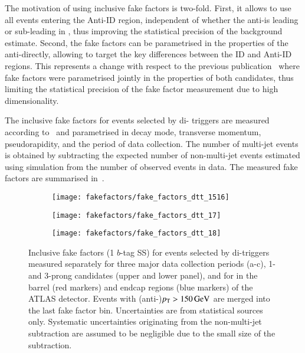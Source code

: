 {  The motivation of using inclusive fake factors is two-fold. First,
  it allows to use all events entering the Anti-ID region, independent
  of whether the anti-\tauhadvis is leading or sub-leading in \pT,
  thus improving the statistical precision of the background
  estimate. Second, the fake factors can be parametrised in the
  properties of the anti-\tauhadvis directly, allowing to target the
  key differences between the ID and Anti-ID regions. This represents
  a change with respect to the previous
  publication~\cite{HIGG-2016-16-witherratum} where fake factors were
  parametrised jointly in the properties of both \tauhadvis
  candidates, thus limiting the statistical precision of the fake
  factor measurement due to high dimensionality.

}

The inclusive fake factors for events selected by di-\tauhadvis
triggers are measured according to~ and
parametrised in \tauhadvis decay mode, transverse momentum,
pseudorapidity, and the period of data collection. The number of
multi-jet events is obtained by subtracting the expected number of
non-multi-jet events estimated using simulation from the number of
observed events in data. The measured fake factors are summarised
in~.

\begin{figure}[htbp]
  \centering

  \begin{subfigure}{0.495\textwidth}
    \texttt{[image: fakefactors/fake\_factors\_dtt\_1516]}
  \end{subfigure}
  \begin{subfigure}{0.495\textwidth}
    \texttt{[image: fakefactors/fake\_factors\_dtt\_17]}
  \end{subfigure}

  \begin{subfigure}{0.495\textwidth}
    \texttt{[image: fakefactors/fake\_factors\_dtt\_18]}
  \end{subfigure}

  \caption{Inclusive fake factors (1 $b$-tag SS) for events selected
    by di-\tauhadvis triggers measured separately for three major data
    collection periods (a-c), 1- and 3-prong \tauhadvis candidates
    (upper and lower panel), and for \tauhadvis in the barrel (red
    markers) and endcap regions (blue markers) of the ATLAS
    detector. Events with (anti-)\tauhadvis $p_{\text{T}} > \SI{150}{\ensuremath{\text{GeV}}}$ are
    merged into the last fake factor bin. Uncertainties are from
    statistical sources only. Systematic uncertainties originating
    from the non-multi-jet subtraction are assumed to be negligible
    due to the small size of the subtraction.}
  \label{fig:mjfakes_fake_factors}
\end{figure}

